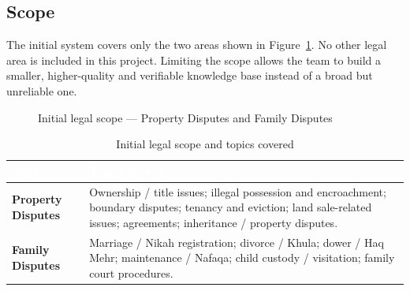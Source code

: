 \documentclass[12pt,a4paper]{report}
\newcommand{\thd}[1]{\textcolor{white}{\textbf{#1}}}
\newcommand{\headrow}{\rowcolor{tablehead}}
\begin{document}
\subsection{Scope}
The initial system covers only the two areas shown in Figure~\ref{fig:scope}. No other legal area is included in this project. Limiting the scope allows the team to build a smaller, higher-quality and verifiable knowledge base instead of a broad but unreliable one.

\begin{figure}[H]
\centering
{}
\caption{Initial legal scope --- Property Disputes and Family Disputes}
\label{fig:scope}
\end{figure}

\begin{table}[H]
\centering
\caption{Initial legal scope and topics covered}
\label{tab:scope}
\begin{tabular}{|L{3.6cm}|L{10.4cm}|}
\hline
\headrow \thd{Area} & \thd{Topics covered} \\ \hline
\textbf{Property Disputes} & Ownership / title issues; illegal possession and encroachment; boundary disputes; tenancy and eviction; land sale-related issues; agreements; inheritance / property disputes. \\ \hline
{}\textbf{Family Disputes} & Marriage / Nikah registration; divorce / Khula; dower / Haq Mehr; maintenance / Nafaqa; child custody / visitation; family court procedures. \\ \hline
\end{tabular}
\end{table}
\end{document}
